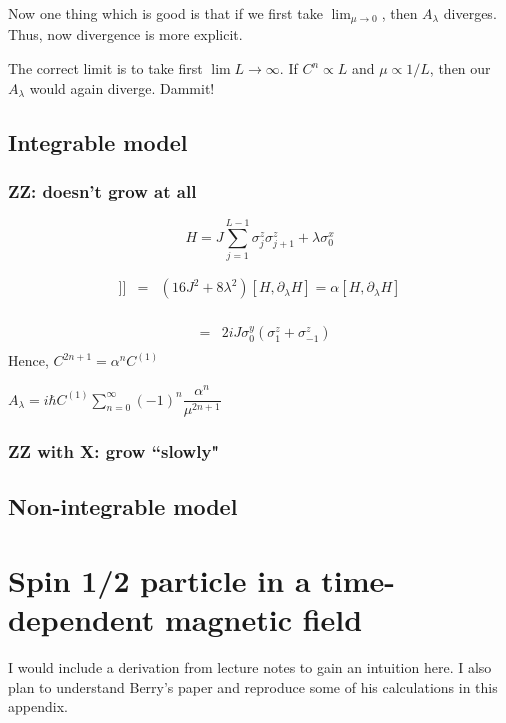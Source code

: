 \documentclass[11pt,a4paper]{article}
\begin{document}
Now one thing which is good is that if we first take $\lim_{\mu \rightarrow 0}$, then $A_{\lambda}$ diverges. Thus, now divergence is more explicit. 

The correct limit is to take first $\lim L \rightarrow \infty$. If $C^n \propto L$ and $\mu \propto 1/L$, then our $A_{\lambda}$ would again diverge. Dammit!

\subsection{ Integrable model}

\subsubsection*{ZZ: doesn't grow at all}
\begin{equation}
H= J \sum_{j=1}^{L-1}  \sigma_j^z \sigma_{j+1}^z +  \lambda  \sigma_0^x
\label{zz}
\end{equation}


\begin{eqnarray}
[H, [H,[H, \partial_{\lambda} H]]] &=&  (16 J^2 + 8 \lambda^2) [H, \partial_{\lambda} H] = \alpha [H, \partial_{\lambda} H]\\
\end{eqnarray}

\begin{eqnarray}
[H, \partial_{\lambda} H] &=&  2 i J \sigma_0^y (\sigma_1^z + \sigma_{-1}^z) \\
\end{eqnarray}
 Hence, $C^{2n+1}= \alpha^n C^{(1)}$

$A_{\lambda} =  i\hbar  C^{(1)}\sum_{n=0}^{\infty}   (-1)^{n} \dfrac{ \alpha^{n}}{\mu^{2n+1}}
$ 

\subsubsection*{ZZ with X:  grow ``slowly"}


\subsection{Non-integrable model}

\appendix

\section{Spin 1/2 particle in a time-dependent magnetic field}
I would include a derivation from lecture notes to gain an intuition here. I also plan to understand Berry's paper and reproduce some of his calculations in this appendix.
\end{document}
